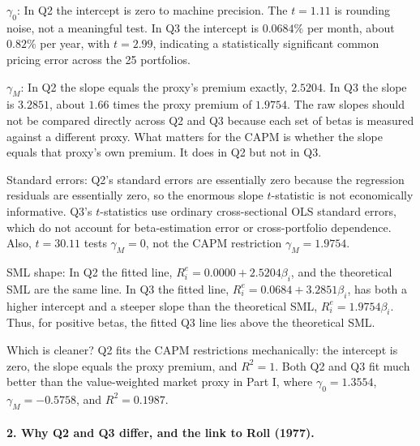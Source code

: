 \begin{tight}
\item $\gamma_0$: In Q2 the intercept is zero to machine precision. The
$t = 1.11$ is rounding noise, not a meaningful test. In Q3 the intercept is
$0.0684\%$ per month, about $0.82\%$ per year, with $t = 2.99$, indicating a
statistically significant common pricing error across the 25 portfolios.

\item $\gamma_M$: In Q2 the slope equals the proxy's premium exactly,
$2.5204$. In Q3 the slope is $3.2851$, about $1.66$ times the proxy premium of
$1.9754$. The raw slopes should not be compared directly across Q2 and Q3
because each set of betas is measured against a different proxy. What matters
for the CAPM is whether the slope equals that proxy's own premium. It does in
Q2 but not in Q3.

\item Standard errors: Q2's standard errors are essentially zero because the
regression residuals are essentially zero, so the enormous slope $t$-statistic
is not economically informative. Q3's $t$-statistics use ordinary
cross-sectional OLS standard errors, which do not account for beta-estimation
error or cross-portfolio dependence. Also, $t = 30.11$ tests $\gamma_M = 0$,
not the CAPM restriction $\gamma_M = 1.9754$.

\item SML shape: In Q2 the fitted line,
$R^e_i = 0.0000 + 2.5204\beta_i$,
and the theoretical SML are the same line. In Q3 the fitted line,
$R^e_i = 0.0684 + 3.2851\beta_i$,
has both a higher intercept and a steeper slope than the theoretical SML,
$R^e_i = 1.9754\beta_i$. Thus, for positive betas, the fitted Q3 line lies
above the theoretical SML.

\item Which is cleaner? Q2 fits the CAPM restrictions mechanically: the
intercept is zero, the slope equals the proxy premium, and $R^2 = 1$. Both Q2
and Q3 fit much better than the value-weighted market proxy in Part I, where
$\gamma_0 = 1.3554$, $\gamma_M = -0.5758$, and $R^2 = 0.1987$.
\end{tight}

\paragraph{2. Why Q2 and Q3 differ, and the link to Roll (1977).}

